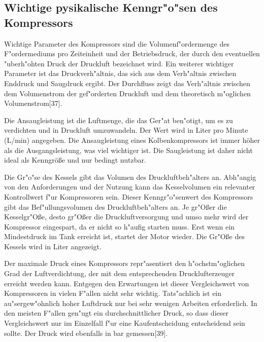  \subsection{Wichtige pysikalische Kenngr"o"sen des Kompressors}
 
 Wichtige Parameter des Kompressors sind die Volumenf"ordermenge des 
 F"ordermediums pro Zeiteinheit und der Betriebsdruck, der durch den 
 eventuellen "uberh"ohten Druck der Druckluft bezeichnet wird. Ein weiterer 
 wichtiger Parameter ist das Druckverh"altnis, das sich aus dem Verh"altnis 
 zwischen Enddruck und Saugdruck ergibt. Der Durchfluss zeigt das Verh"altnis
  zwischen dem Volumenstrom der gef"orderten Druckluft und 
  dem theoretisch m"oglichen Volumenstrom[37].
  
 Die Ansaugleistung ist die Luftmenge, die das Ger"at ben"otigt, 
  um es zu verdichten und in Druckluft umzuwandeln. Der Wert wird in 
  Liter pro Minute (L/min) angegeben. Die Ansaugleistung eines 
  Kolbenkompressors ist immer höher als die Ausgangsleistung, was viel wichtiger ist.
   Die Saugleistung ist daher nicht ideal als Kenngröße und
    nur bedingt nutzbar.\newline
    
    Die Gr"o"se des Kessels gibt das Volumen des Druckluftbeh"alters an. 
    Abh"angig von den Anforderungen und der Nutzung kann das Kesselvolumen 
    ein relevanter Kontrollwert f"ur Kompressoren sein. Dieser Kenngr"o"senwert 
    des Kompressors gibt das Bef"ullungsvolumen des Druckluftbeh"alters an.
    Je gr"Oßer die Kesselgr"Oße, desto gr"Oßer die Druckluftversorgung und umso mehr 
    wird der Kompressor eingespart, da er nicht  so h"aufig starten muss.
     Erst wenn ein Mindestdruck im Tank erreicht ist, startet der Motor wieder.
     Die Gr"Oße des Kessels wird in Liter angezeigt.\newline
     
     Der maximale Druck eines Kompressors repr"asentiert den 
     h"ochstm"oglichen Grad der Luftverdichtung, der mit dem 
     entsprechenden Drucklufterzeuger erreicht werden kann. 
     Entgegen den Erwartungen ist dieser Vergleichswert von
      Kompressoren in vielen F"allen nicht sehr wichtig. 
      Tats"achlich ist ein au"sergew"ohnlich hoher Luftdruck nur 
      bei sehr wenigen Arbeiten erforderlich. In den meisten 
      F"allen gen"ugt ein durchschnittlicher Druck, so dass dieser 
      Vergleichswert nur im Einzelfall f"ur eine Kaufentscheidung 
      entscheidend sein sollte.
Der Druck wird ebenfalls in bar gemessen[39].
    
